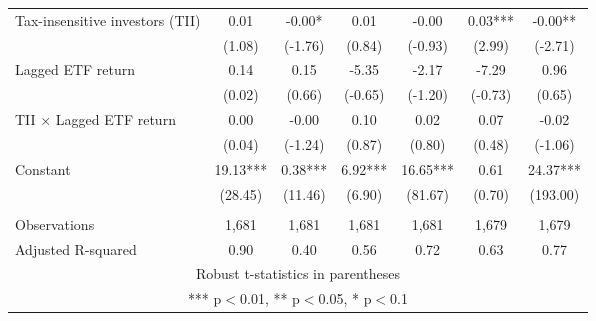 \documentclass[]{article}
\begin{document}
\begin{tabular}{lcccccc}
Tax-insensitive investors (TII) & 0.01 & -0.00* & 0.01 & -0.00 & 0.03*** & -0.00** \\
 & (1.08) & (-1.76) & (0.84) & (-0.93) & (2.99) & (-2.71) \\
Lagged ETF return & 0.14 & 0.15 & -5.35 & -2.17 & -7.29 & 0.96 \\
 & (0.02) & (0.66) & (-0.65) & (-1.20) & (-0.73) & (0.65) \\
TII $\times$ Lagged ETF return & 0.00 & -0.00 & 0.10 & 0.02 & 0.07 & -0.02 \\
 & (0.04) & (-1.24) & (0.87) & (0.80) & (0.48) & (-1.06) \\
Constant & 19.13*** & 0.38*** & 6.92*** & 16.65*** & 0.61 & 24.37*** \\
 & (28.45) & (11.46) & (6.90) & (81.67) & (0.70) & (193.00) \\
 &  &  &  &  &  &  \\
Observations & 1,681 & 1,681 & 1,681 & 1,681 & 1,679 & 1,679 \\
 Adjusted R-squared & 0.90 & 0.40 & 0.56 & 0.72 & 0.63 & 0.77 \\ \hline
\multicolumn{7}{c}{ Robust t-statistics in parentheses} \\
\multicolumn{7}{c}{ *** p$<$0.01, ** p$<$0.05, * p$<$0.1} \\
\end{tabular}
\end{document}
